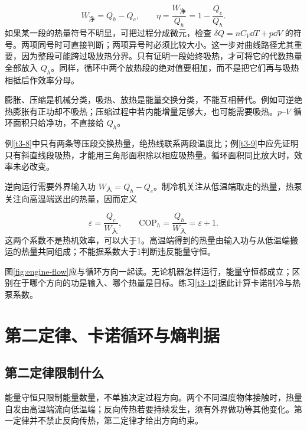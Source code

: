 \[W_{\text{净}}=Q_h-Q_c,\qquad\boxed{\eta=\frac{W_{\text{净}}}{Q_h}=1-\frac{Q_c}{Q_h}}.
\]
如果某一段的热量符号不明显，可把过程分成微元，检查 $\delta Q=nC_V\dd T+p\dd V$ 的符号。两项同号时可直接判断；两项异号时必须比较大小。这一步对曲线路径尤其重要，因为整段可能跨过吸放热分界。只有证明一段始终吸热，才可将它的代数热量全部放入 $Q_h$。同样，循环中两个放热段的绝对值要相加，而不是把它们再与吸热相抵后作效率分母。

膨胀、压缩是机械分类，吸热、放热是能量交换分类，不能互相替代。例如可逆绝热膨胀有正功却不吸热；压缩过程中若内能增量足够大，也可能需要吸热。$p$--$V$ 循环面积只给净功，不直接给 $Q_h$。

例\ref{t3-8}中只有两条等压段交换热量，绝热线联系两段温度比；例\ref{t3-9}中应先证明只有斜直线段吸热，才能用三角形面积除以相应吸热量。循环面积同比放大时，效率未必改变。


逆向运行需要外界输入功 $W_{\text{入}}=Q_h-Q_c$。制冷机关注从低温端取走的热量，热泵关注向高温端送出的热量，因而定义

\[\varepsilon=\frac{Q_c}{W_{\text{入}}},\qquad\mathrm{COP}_h=\frac{Q_h}{W_{\text{入}}}=\varepsilon+1.
\]
这两个系数不是热机效率，可以大于1。高温端得到的热量由输入功与从低温端搬运的热量共同组成；不能据系数大于1判断违反能量守恒。


图\ref{fig:engine-flow}应与循环方向一起读。无论机器怎样运行，能量守恒都成立；区别在于哪个方向的功是输入、哪个热量是目标。练习\ref{t3-12}据此计算卡诺制冷与热泵系数。

\section{第二定律、卡诺循环与熵判据}
\subsection{第二定律限制什么}
能量守恒只限制能量数量，不单独决定过程方向。两个不同温度物体接触时，热量自发由高温端流向低温端；反向传热若要持续发生，须有外界做功等其他变化。第一定律并不禁止反向传热，第二定律才给出方向约束。


